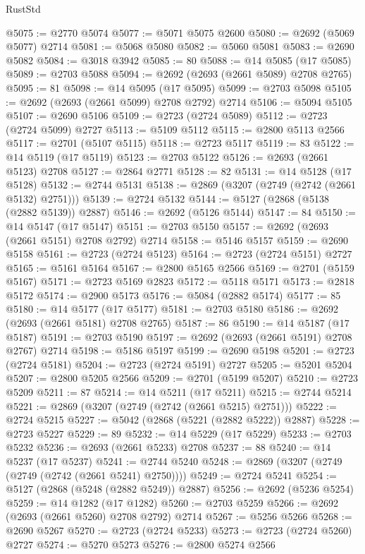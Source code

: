 \begin{lexlean}{RustStd}
\begin{coremodule}
{\begin{coremodule}
{{{{{{{{{{{{{{{{{{{{{{{{{{{{{{{{{{{{{{{@5075 := @2770 @5074
@5077 := @5071 @5075 @2600
@5080 := @2692 (@5069 @5077) @2714
@5081 := @5068 @5080
@5082 := @5060 @5081
@5083 := @2690 @5082
@5084 := @3018 @3942
@5085 := 80
@5088 := @14 @5085 (@17 @5085)
@5089 := @2703 @5088
@5094 := @2692 (@2693 (@2661 @5089) @2708 @2765)
@5095 := 81
@5098 := @14 @5095 (@17 @5095)
@5099 := @2703 @5098
@5105 := @2692 (@2693 (@2661 @5099) @2708 @2792) @2714
@5106 := @5094 @5105
@5107 := @2690 @5106
@5109 := @2723 (@2724 @5089)
@5112 := @2723 (@2724 @5099) @2727
@5113 := @5109 @5112
@5115 := @2800 @5113 @2566
@5117 := @2701 (@5107 @5115)
@5118 := @2723 @5117
@5119 := 83
@5122 := @14 @5119 (@17 @5119)
@5123 := @2703 @5122
@5126 := @2693 (@2661 @5123) @2708
@5127 := @2864 @2771
@5128 := 82
@5131 := @14 @5128 (@17 @5128)
@5132 := @2744 @5131
@5138 := @2869 (@3207 (@2749 (@2742 (@2661 @5132) @2751)))
@5139 := @2724 @5132
@5144 := @5127 (@2868 (@5138 (@2882 @5139)) @2887)
@5146 := @2692 (@5126 @5144)
@5147 := 84
@5150 := @14 @5147 (@17 @5147)
@5151 := @2703 @5150
@5157 := @2692 (@2693 (@2661 @5151) @2708 @2792) @2714
@5158 := @5146 @5157
@5159 := @2690 @5158
@5161 := @2723 (@2724 @5123)
@5164 := @2723 (@2724 @5151) @2727
@5165 := @5161 @5164
@5167 := @2800 @5165 @2566
@5169 := @2701 (@5159 @5167)
@5171 := @2723 @5169 @2823
@5172 := @5118 @5171
@5173 := @2818 @5172
@5174 := @2900 @5173
@5176 := @5084 (@2882 @5174)
@5177 := 85
@5180 := @14 @5177 (@17 @5177)
@5181 := @2703 @5180
@5186 := @2692 (@2693 (@2661 @5181) @2708 @2765)
@5187 := 86
@5190 := @14 @5187 (@17 @5187)
@5191 := @2703 @5190
@5197 := @2692 (@2693 (@2661 @5191) @2708 @2767) @2714
@5198 := @5186 @5197
@5199 := @2690 @5198
@5201 := @2723 (@2724 @5181)
@5204 := @2723 (@2724 @5191) @2727
@5205 := @5201 @5204
@5207 := @2800 @5205 @2566
@5209 := @2701 (@5199 @5207)
@5210 := @2723 @5209
@5211 := 87
@5214 := @14 @5211 (@17 @5211)
@5215 := @2744 @5214
@5221 := @2869 (@3207 (@2749 (@2742 (@2661 @5215) @2751)))
@5222 := @2724 @5215
@5227 := @5042 (@2868 (@5221 (@2882 @5222)) @2887)
@5228 := @2723 @5227
@5229 := 89
@5232 := @14 @5229 (@17 @5229)
@5233 := @2703 @5232
@5236 := @2693 (@2661 @5233) @2708
@5237 := 88
@5240 := @14 @5237 (@17 @5237)
@5241 := @2744 @5240
@5248 := @2869 (@3207 (@2749 (@2749 (@2742 (@2661 @5241) @2750))))
@5249 := @2724 @5241
@5254 := @5127 (@2868 (@5248 (@2882 @5249)) @2887)
@5256 := @2692 (@5236 @5254)
@5259 := @14 @1282 (@17 @1282)
@5260 := @2703 @5259
@5266 := @2692 (@2693 (@2661 @5260) @2708 @2792) @2714
@5267 := @5256 @5266
@5268 := @2690 @5267
@5270 := @2723 (@2724 @5233)
@5273 := @2723 (@2724 @5260) @2727
@5274 := @5270 @5273
@5276 := @2800 @5274 @2566
}}}}}}}}}}}}}}}}}}}}}}}}}}}}}}}}}}}}}}}
\end{coremodule}}
\end{coremodule}
\end{lexlean}
